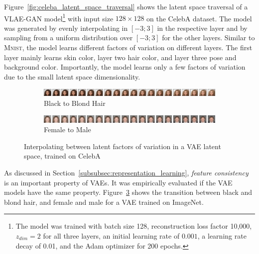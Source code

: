 Figure~\ref{fig:celeba_latent_space_traversal} shows the latent space traversal of a \ac{VLAE}-\ac{GAN} model\footnote{The model was trained with batch size 128, reconstruction loss factor 10,000, $z_{dim}=2$ for all three layers, an initial learning rate of $0.001$, a learning rate decay of 0.01, and the Adam optimizer for 200 epochs.} with input size $128\times 128$ on the CelebA dataset.
The model was generated by evenly interpolating in $[-3; 3]$ in the respective layer and by sampling from a uniform distribution over $[-3; 3]$ for the other layers.
Similar to \textsc{Mnist}, the model learns different factors of variation on different layers.
The first layer mainly learns skin color, layer two hair color, and layer three pose and background color.
Importantly, the model learns only a few factors of variation due to the small latent space dimensionality.

\begin{figure}
    \centering
    \begin{subfigure}{\textwidth}
        \includegraphics[width=\textwidth]{images/latent_space_traversals/vae_celeba_black_to_blond.png}
        \caption{Black to Blond Hair}
        \label{subfig:black_to_blond}
    \end{subfigure}
    \begin{subfigure}{\textwidth}
        \includegraphics[width=\textwidth]{images/latent_space_traversals/vae_celeba_man_to_woman.png}
        \caption{Female to Male}
        \label{subfig:female_to_male}
    \end{subfigure}
    \caption[Interpolating between black and blond hair, man and woman]{Interpolating between latent factors of variation in a \ac{VAE} latent space, trained on CelebA}
    \label{fig:vae_celeba_black_to_blond_man_to_woman}
\end{figure}

As discussed in Section~\ref{subsubsec:representation_learning}, \textit{feature consistency} is an important property of \acp{VAE}.
It was empirically evaluated if the \ac{VAE} models have the same property.
Figure~\ref{fig:vae_celeba_black_to_blond_man_to_woman} shows the transition between black and blond hair, and female and male for a \ac{VAE} trained on ImageNet.

